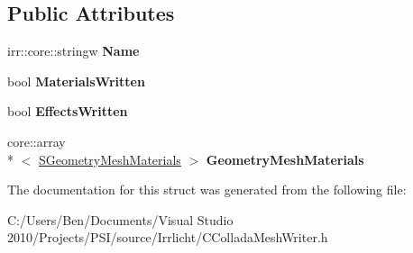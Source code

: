 \subsection*{Public Attributes}
\begin{DoxyCompactItemize}
\item 
\hypertarget{structirr_1_1scene_1_1_c_collada_mesh_writer_1_1_s_collada_mesh_af5a90c707ad68a1317df4a423f5f1f2e}{irr\-::core\-::stringw {\bfseries Name}}\label{structirr_1_1scene_1_1_c_collada_mesh_writer_1_1_s_collada_mesh_af5a90c707ad68a1317df4a423f5f1f2e}

\item 
\hypertarget{structirr_1_1scene_1_1_c_collada_mesh_writer_1_1_s_collada_mesh_ac4026d25547c7f7566c7c036647ed39a}{bool {\bfseries Materials\-Written}}\label{structirr_1_1scene_1_1_c_collada_mesh_writer_1_1_s_collada_mesh_ac4026d25547c7f7566c7c036647ed39a}

\item 
\hypertarget{structirr_1_1scene_1_1_c_collada_mesh_writer_1_1_s_collada_mesh_a4bf727c8fe03457ced5f5a45d2613c75}{bool {\bfseries Effects\-Written}}\label{structirr_1_1scene_1_1_c_collada_mesh_writer_1_1_s_collada_mesh_a4bf727c8fe03457ced5f5a45d2613c75}

\item 
\hypertarget{structirr_1_1scene_1_1_c_collada_mesh_writer_1_1_s_collada_mesh_a40f95a7731a04d76996b59c3a236d33a}{core\-::array\\*
$<$ \hyperlink{structirr_1_1scene_1_1_c_collada_mesh_writer_1_1_s_geometry_mesh_materials}{S\-Geometry\-Mesh\-Materials} $>$ {\bfseries Geometry\-Mesh\-Materials}}\label{structirr_1_1scene_1_1_c_collada_mesh_writer_1_1_s_collada_mesh_a40f95a7731a04d76996b59c3a236d33a}

\end{DoxyCompactItemize}


The documentation for this struct was generated from the following file\-:\begin{DoxyCompactItemize}
\item 
C\-:/\-Users/\-Ben/\-Documents/\-Visual Studio 2010/\-Projects/\-P\-S\-I/source/\-Irrlicht/C\-Collada\-Mesh\-Writer.\-h\end{DoxyCompactItemize}
